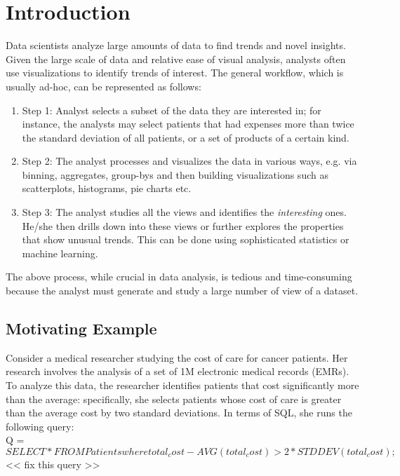 \section{Introduction}
\label{sec:intro}
Data scientists analyze large amounts of data to find trends and novel insights.
Given the large scale of data and relative ease of visual analysis, analysts
often use visualizations to identify trends of interest. The general workflow,
which is usually ad-hoc, can be represented as follows:

\begin{enumerate}
  \item Step 1: Analyst selects a subset of the data they are interested in; for
  instance, the analysts may select patients that had expenses more than twice
  the standard deviation of all patients, or a set of products of a certain kind.
  \item Step 2: The analyst processes and visualizes the data in various ways,
  e.g. via binning, aggregates, group-bys and then building
  visualizations such as scatterplots, histograms, pie charts etc.
  \item Step 3: The analyst studies all the views and identifies the
  {\it interesting} ones. He/she then drills down into these views or further
  explores the properties that show unusual trends. This can be done using sophisticated
  statistics or machine learning.
\end{enumerate}

The above process, while crucial in data analysis, is tedious and time-consuming
because the analyst must generate and study a large number of view of a
dataset. 

\subsection{Motivating Example}
\label{motivation_example}

Consider a medical researcher studying the cost of care for cancer patients. Her
research involves the analysis of a set of 1M electronic medical records (EMRs).
To analyze this data, the researcher identifies patients that cost
significantly more than the average: specifically, she selects patients whose
cost of care is greater than the average cost by two standard deviations. In
terms of SQL, she runs the following query: \\

\noindent Q = $SELECT * FROM Patients where total_cost - AVG(total_cost) >
2 * STDDEV (total_cost);$
<< fix this query >>

